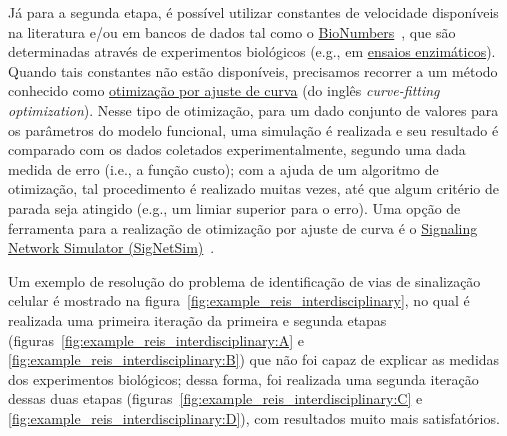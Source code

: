 \documentclass[12pt]{article}
\begin{document}
Já para a segunda etapa, é possível utilizar constantes de velocidade disponíveis na literatura e/ou em bancos de dados tal como o \href{http://bionumbers.hms.harvard.edu/}{BioNumbers}~\cite{milo2009bionumbers}, que são determinadas através de experimentos biológicos (e.g., em \href{https://en.wikipedia.org/wiki/Enzyme\_assay}{ensaios enzimáticos}). Quando tais constantes não estão disponíveis, precisamos recorrer a um método conhecido como \href{https://en.wikipedia.org/wiki/Curve\_fitting}{otimização por ajuste de curva} (do inglês \emph{curve-fitting optimization}). Nesse tipo de otimização, para um dado conjunto de valores para os parâmetros do modelo funcional, uma simulação é realizada e seu resultado é comparado com os dados coletados experimentalmente, segundo uma dada medida de erro (i.e., a função custo); com a ajuda de um algoritmo de otimização, tal procedimento é realizado muitas vezes, até que algum critério de parada seja atingido (e.g., um limiar superior para o erro). Uma opção de ferramenta para a realização de otimização por ajuste de curva é o \href{https://github.com/vincent-noel/SigNetSim}{Signaling Network Simulator (SigNetSim)}~\cite{Noel2017SigNetSim}.

Um exemplo de resolução do problema de identificação de vias de sinalização celular é mostrado na figura~\ref{fig:example_reis_interdisciplinary}, no qual é realizada uma primeira iteração da primeira e segunda etapas (figuras~\ref{fig:example_reis_interdisciplinary:A} e \ref{fig:example_reis_interdisciplinary:B}) que não foi capaz de explicar as medidas dos experimentos biológicos; dessa forma, foi realizada uma segunda iteração dessas duas etapas (figuras~\ref{fig:example_reis_interdisciplinary:C} e \ref{fig:example_reis_interdisciplinary:D}), com resultados muito mais satisfatórios.
\end{document}
